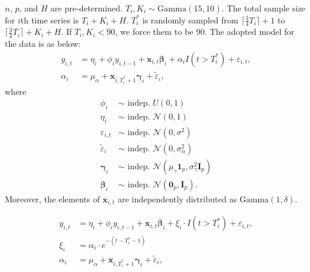 \documentclass[12pt]{article}
\def\mbf#1{\mathbf{#1}} %
\def\mrm#1{\mathrm{#1}} %
\def\mc#1{\mathcal{#1}} %
\def\mc#1{\mathcal{#1}}
\def\bs#1{\boldsymbol{#1}}
\newcommand{\ceil}[1]{\lceil #1 \rceil}
\theoremstyle{definition}
\theoremstyle{definition}
\begin{document}
$n$, $p$, and $H$ are pre-determined. $T_i, K_i \sim \mrm{Gamma}(15, 10)$.  The total sample size for $i$th time series is $T_i + K_i + H$. $T_i^*$ is randomly sampled from $\ceil{\frac{1}{4}T_i}+1$ to $\ceil{\frac{3}{4} T_i} + K_i+ H$. If $T_i, K_i < 90$, we force them to be 90. The adopted model for the data is as below:
\begin{align*}
  y_{i,t} &= \eta_i + \phi_i y_{i,t-1} + \mbf{x}_{i,t} \bs{\beta}_i + \alpha_i I(t > T_i^*) + \varepsilon_{i,t},\\
  \alpha_i &= \mu_{\alpha} + \mbf{x}_{i,T_i^*+1}\bs{\gamma}_i + \tilde{\varepsilon}_{i},
\end{align*}
where
\begin{align*}
  \phi_i & \sim \text{ indep. }  U(0,1) \\
  \eta_i & \sim \text{ indep. }  \mc{N}(0,1) \\
  \varepsilon_{i,t} & \sim \text{ indep. } \mc{N}(0, \sigma^2)\\
  \tilde{\varepsilon}_i & \sim \text{ indep. } \mc{N}(0, \sigma_{\alpha}^2)
  \\
  \bs{\gamma}_i & \sim \text{ indep. } \mc{N}(\mu_{\gamma}\bs{1}_p, \sigma_{\gamma}^2 \mbf{I}_p) \\
  \bs{\beta}_i & \sim \text{ indep. }  \mc{N}(\bs{0}_p, \mbf{I}_p).
\end{align*}
Moreover, the elements of $\mathbf{x}_{i,t}$ are independently distributed as $\mrm{Gamma}(1,\delta)$.


\begin{align*}
  y_{i,t} &= \eta_i + \phi_i y_{i,t-1} + \mbf{x}_{i,t} \bs{\beta}_i + \xi_i\cdot  I(t > T_i^*) + \varepsilon_{i,t},\\
  \xi_i &= \alpha_i \cdot e^{-(t-T_i^*-1)} \\
  \alpha_i &= \mu_{\alpha} + \mbf{x}_{i,T_i^*+1}\bs{\gamma}_i + \tilde{\varepsilon}_{i},
\end{align*}
\end{document}
